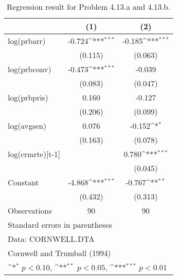 \begin{table}[htbp]\centering
\def\sym#1{\ifmmode^{#1}\else\(^{#1}\)\fi}
\caption{Regression result for Problem 4.13.a and 4.13.b.}
\begin{tabular}{l*{2}{c}}
\toprule
                    &\multicolumn{1}{c}{(1)}         &\multicolumn{1}{c}{(2)}         \\
\midrule
log(prbarr)         &      -0.724\sym{***}&      -0.185\sym{***}\\
                    &     (0.115)         &     (0.063)         \\
\addlinespace
log(prbconv)        &      -0.473\sym{***}&      -0.039         \\
                    &     (0.083)         &     (0.047)         \\
\addlinespace
log(prbpris)        &       0.160         &      -0.127         \\
                    &     (0.206)         &     (0.099)         \\
\addlinespace
log(avgsen)         &       0.076         &      -0.152\sym{*}  \\
                    &     (0.163)         &     (0.078)         \\
\addlinespace
log(crmrte)[t-1]    &                     &       0.780\sym{***}\\
                    &                     &     (0.045)         \\
\addlinespace
Constant            &      -4.868\sym{***}&      -0.767\sym{**} \\
                    &     (0.432)         &     (0.313)         \\
\midrule
Observations        &          90         &          90         \\
\bottomrule
\multicolumn{3}{l}{\footnotesize Standard errors in parentheses}\\
\multicolumn{3}{l}{\footnotesize Data: CORNWELL.DTA}\\
\multicolumn{3}{l}{\footnotesize Cornwell and Trumball (1994)}\\
\multicolumn{3}{l}{\footnotesize \sym{*} \(p<0.10\), \sym{**} \(p<0.05\), \sym{***} \(p<0.01\)}\\
\end{tabular}
\end{table}
